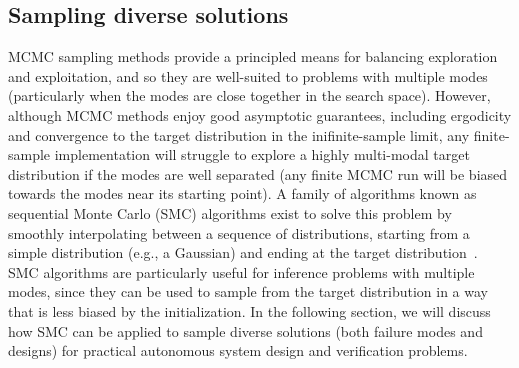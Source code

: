 \subsection{Sampling diverse solutions}

MCMC sampling methods provide a principled means for balancing exploration and exploitation, and so they are well-suited to problems with multiple modes (particularly when the modes are close together in the search space). However, although MCMC methods enjoy good asymptotic guarantees, including ergodicity and convergence to the target distribution in the inifinite-sample limit, any finite-sample implementation will struggle to explore a highly multi-modal target distribution if the modes are well separated (any finite MCMC run will be biased towards the modes near its starting point). A family of algorithms known as sequential Monte Carlo (SMC) algorithms exist to solve this problem by smoothly interpolating between a sequence of distributions, starting from a simple distribution (e.g., a Gaussian) and ending at the target distribution~\cite{chopinIntroductionSequentialMonte2020}. SMC algorithms are particularly useful for inference problems with multiple modes, since they can be used to sample from the target distribution in a way that is less biased by the initialization. In the following section, we will discuss how SMC can be applied to sample diverse solutions (both failure modes and designs) for practical autonomous system design and verification problems.

